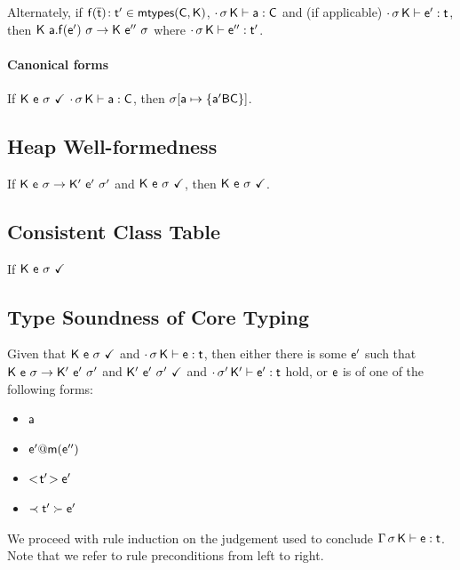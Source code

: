 \documentclass[a4paper,USenglish]{tex/lipics-v2016}
\begin{document}
Alternately, if $\Mtype\f{\b\t}\tp \in \classoff{\C}{\K}$, $\cdot\,\sigma\,{\sf{K}}\vdash {\sf{a}} : {\sf{C}}$ and (if applicable)
$\EnvType\cdot\s\K\ep\t$, then ${{\sf{K}}}~{{\sf{a}}.{\sf{f}}({{{\sf{e'}}}})}~{\sigma} \rightarrow {\ensuremath{{\sf{K}}}}~{{{{\sf{e''}}}}}~{\sigma}$ where $\EnvType\cdot\s\K\epp\tp$.

\paragraph{Canonical forms}


If ${\sf{K}}~{\sf{e}}~\sigma~\checkmark$ $\cdot\,\sigma\,{\sf{K}}\vdash {\sf{a}} : {\sf{C}}$, then $\sigma[{\sf{a}} \mapsto \{{\sf{a}}' {\sf{B}} {\sf{C}}\}]$.

\subsection{Heap Well-formedness}

If ${{\sf{K}}}~{{\sf{e}}}~{\sigma} \rightarrow {{\ensuremath{{\sf{K'}}}}}~{{{{\sf{e'}}}}}~{{{\sigma'}}}$ and ${\sf{K}}~{\sf{e}}~\sigma~\checkmark$, then ${\sf{K}}~{\sf{e}}~\sigma~\checkmark$. 

\subsection{Consistent Class Table}

If ${\sf{K}}~{\sf{e}}~\sigma~\checkmark$

\subsection{Type Soundness of Core \kafka Typing}

Given that ${\sf{K}}~{\sf{e}}~\sigma~\checkmark$ and $\EnvType\cdot\s\K\e\t$, then either there is some ${{{\sf{e'}}}}$ 
such that ${{\sf{K}}}~{{\sf{e}}}~{\sigma} \rightarrow {{\ensuremath{{\sf{K'}}}}}~{{{{\sf{e'}}}}}~{{{\sigma'}}}$ and ${{\sf{K'}}}~{{{\sf{e'}}}}~{{\sigma'}}~\checkmark$ and $\EnvType\cdot\sp\Kp\ep\t$ hold, 
or ${\sf{e}}$ is of one of the following forms:
\begin{itemize} 
\item ${\sf{a}}$
\item $\DynCall\ep\m{\epp}$
\item $\SubCast\tp\ep$
\item $\ShaCast\tp\ep$
\end{itemize}

We proceed with rule induction on the judgement used to conclude $\EnvType\Env\s\K\e\t$. 
Note that we refer to rule preconditions from left to right.
\end{document}
